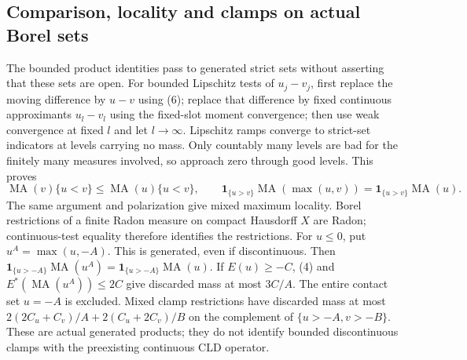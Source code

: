 \documentclass[11pt]{article}
\newcommand{\MA}{\operatorname{MA}}
\begin{document}
\subsection{Comparison, locality and clamps on actual Borel sets}
The bounded product identities pass to generated strict sets without asserting
that these sets are open. For bounded Lipschitz tests of $u_j-v_j$, first
replace the moving difference by $u-v$ using (6); replace that difference by
fixed continuous approximants $u_l-v_l$ using the fixed-slot moment convergence;
then use weak convergence at fixed $l$ and let $l\to\infty$.
Lipschitz ramps converge to strict-set indicators at levels carrying no mass.
Only countably many levels are bad for the finitely many measures involved,
so approach zero through good levels. This proves
\[
 \MA(v)\{u<v\}\le\MA(u)\{u<v\},\qquad
 \mathbf1_{\{u>v\}}\MA(\max(u,v))
   =\mathbf1_{\{u>v\}}\MA(u).                              \tag{7}
\]
The same argument and polarization give mixed maximum locality.
Borel restrictions of a finite Radon measure on compact Hausdorff $X$ are
Radon; continuous-test equality therefore identifies the restrictions.
For $u\le0$, put $u^A=\max(u,-A)$. This is generated, even if discontinuous.
Then $\mathbf1_{\{u>-A\}}\MA(u^A)=\mathbf1_{\{u>-A\}}\MA(u)$.
If $E(u)\ge-C$, (4) and $E^*(\MA(u^A))\le2C$ give discarded mass
at most $3C/A$. The entire contact set $u=-A$ is excluded.
Mixed clamp restrictions have discarded mass at most
$2(2C_u+C_v)/A+2(C_u+2C_v)/B$ on the complement of
$\{u>-A,v>-B\}$. These are actual generated products; they do not identify
bounded discontinuous clamps with the preexisting continuous CLD operator.
\end{document}
